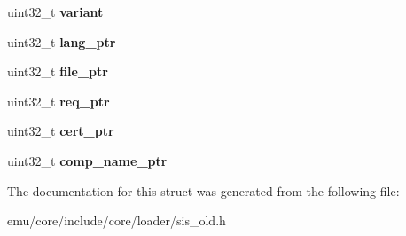 \begin{DoxyCompactItemize}
\item 
\mbox{\label{structeka2l1_1_1loader_1_1sis__old__header_acb639afd27ec641ee341b74359be47b1}} 
uint32\+\_\+t {\bfseries variant}
\item 
\mbox{\label{structeka2l1_1_1loader_1_1sis__old__header_a244a63b8a7496b02e93b64661482281c}} 
uint32\+\_\+t {\bfseries lang\+\_\+ptr}
\item 
\mbox{\label{structeka2l1_1_1loader_1_1sis__old__header_a6e5226cfdd5d7115b825ab9dcffd18ea}} 
uint32\+\_\+t {\bfseries file\+\_\+ptr}
\item 
\mbox{\label{structeka2l1_1_1loader_1_1sis__old__header_aabcf7a89f994d4f7c93a9b35a830a0f5}} 
uint32\+\_\+t {\bfseries req\+\_\+ptr}
\item 
\mbox{\label{structeka2l1_1_1loader_1_1sis__old__header_a8deddc0d76e448c044e968877d1fe93b}} 
uint32\+\_\+t {\bfseries cert\+\_\+ptr}
\item 
\mbox{\label{structeka2l1_1_1loader_1_1sis__old__header_a21f024f71d6f25b624ea62e3cd58591b}} 
uint32\+\_\+t {\bfseries comp\+\_\+name\+\_\+ptr}
\end{DoxyCompactItemize}


The documentation for this struct was generated from the following file\+:\begin{DoxyCompactItemize}
\item 
emu/core/include/core/loader/sis\+\_\+old.\+h\end{DoxyCompactItemize}
